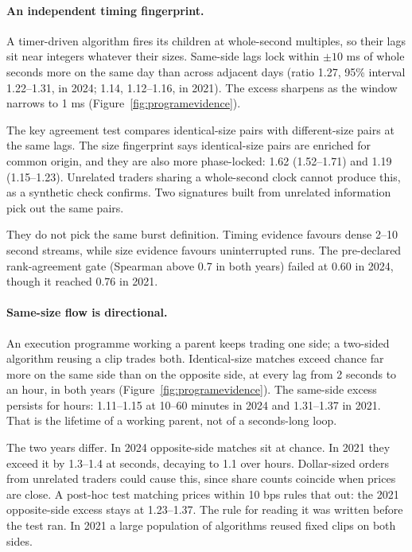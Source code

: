 \documentclass[11pt]{article}
\begin{document}
\paragraph{An independent timing fingerprint.} A timer-driven algorithm fires its children at
whole-second multiples, so their lags sit near integers whatever their sizes. Same-side lags lock
within $\pm10$ ms of whole seconds more on the same day than across adjacent days (ratio 1.27,
95\% interval 1.22--1.31, in 2024; 1.14, 1.12--1.16, in 2021). The excess sharpens as the window
narrows to 1 ms (Figure~\ref{fig:programevidence}).

The key agreement test compares identical-size pairs with different-size pairs at the same lags.
The size fingerprint says identical-size pairs are enriched for common origin, and they are also
more phase-locked: 1.62 (1.52--1.71) and 1.19 (1.15--1.23). Unrelated traders sharing a
whole-second clock cannot produce this, as a synthetic check confirms. Two signatures built from
unrelated information pick out the same pairs.

They do not pick the same burst definition. Timing evidence favours dense 2--10 second streams,
while size evidence favours uninterrupted runs. The pre-declared rank-agreement gate (Spearman
above 0.7 in both years) failed at 0.60 in 2024, though it reached 0.76 in 2021.

\paragraph{Same-size flow is directional.} An execution programme working a parent keeps trading
one side; a two-sided algorithm reusing a clip trades both. Identical-size matches exceed chance
far more on the same side than on the opposite side, at every lag from 2 seconds to an hour, in
both years (Figure~\ref{fig:programevidence}). The same-side excess persists for hours: 1.11--1.15
at 10--60 minutes in 2024 and 1.31--1.37 in 2021. That is the lifetime of a working parent, not of a
seconds-long loop.

The two years differ. In 2024 opposite-side matches sit at chance. In 2021 they exceed it by
1.3--1.4 at seconds, decaying to 1.1 over hours. Dollar-sized orders from unrelated traders could
cause this, since share counts coincide when prices are close. A post-hoc test matching prices
within 10 bps rules that out: the 2021 opposite-side excess stays at 1.23--1.37. The rule for
reading it was written before the test ran. In 2021 a large population of algorithms reused fixed
clips on both sides.
\end{document}
